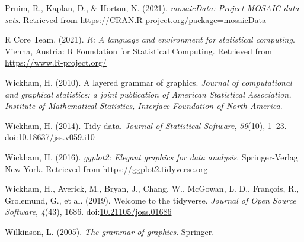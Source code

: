 \documentclass[10pt,a4paper,onecolumn]{article}
\newlength{\cslhangindent}
\newlength{\cslentryspacingunit} %
\newenvironment{CSLReferences}[2] %
 {%
  \setlength{\parindent}{0pt}
  \ifodd #1
  \let\oldpar\par
  \def\par{\hangindent=\cslhangindent\oldpar}
  \fi
  \setlength{\parskip}{#2\cslentryspacingunit}
 }%
 {}
\begin{document}
\hypertarget{refs}{}
\begin{CSLReferences}{1}{0}
\leavevmode{}%
Pruim, R., Kaplan, D., \& Horton, N. (2021). \emph{mosaicData: Project
MOSAIC data sets}. Retrieved from
\url{https://CRAN.R-project.org/package=mosaicData}

\leavevmode{}%
R Core Team. (2021). \emph{R: A language and environment for statistical
computing}. Vienna, Austria: R Foundation for Statistical Computing.
Retrieved from \url{https://www.R-project.org/}

\leavevmode{}%
Wickham, H. (2010). A layered grammar of graphics. \emph{Journal of
computational and graphical statistics: a joint publication of American
Statistical Association, Institute of Mathematical Statistics, Interface
Foundation of North America}.

\leavevmode{}%
Wickham, H. (2014). Tidy data. \emph{Journal of Statistical Software},
\emph{59}(10), 1--23.
doi:\href{https://doi.org/10.18637/jss.v059.i10}{10.18637/jss.v059.i10}

\leavevmode{}%
Wickham, H. (2016). \emph{ggplot2: Elegant graphics for data analysis}.
Springer-Verlag New York. Retrieved from
\url{https://ggplot2.tidyverse.org}

\leavevmode{}%
Wickham, H., Averick, M., Bryan, J., Chang, W., McGowan, L. D.,
François, R., Grolemund, G., et al. (2019). Welcome to the {tidyverse}.
\emph{Journal of Open Source Software}, \emph{4}(43), 1686.
doi:\href{https://doi.org/10.21105/joss.01686}{10.21105/joss.01686}

\leavevmode{}%
Wilkinson, L. (2005). \emph{The grammar of graphics}. Springer.

\end{CSLReferences}
\end{document}
